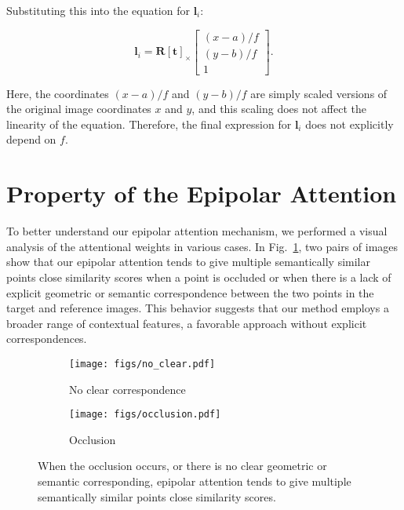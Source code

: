 Substituting this into the equation for $\boldsymbol{l}_i$:

\begin{equation}
    \boldsymbol{l}_i = \mathbf{R} [\boldsymbol{t}]_{\times} 
        \left[\begin{array}{c}
            (x-a) / f \\
            (y-b) / f \\
            1
        \end{array}\right].
\end{equation}

\noindent Here, the coordinates $(x - a)/f$ and $(y - b)/f$ are simply scaled versions of the original image coordinates $x$ and $y$, and this scaling does not affect the linearity of the equation. Therefore, the final expression for $\boldsymbol{l}_i$ does not explicitly depend on $f$.


\section{Property of the Epipolar Attention}
To better understand our epipolar attention mechanism, we performed a visual analysis of the attentional weights in various cases. In  Fig.~\ref{fig:attn_analysis}, two pairs of images show that our epipolar attention tends to give multiple semantically similar points close similarity scores when a point is occluded or when there is a lack of explicit geometric or semantic correspondence between the two points in the target and reference images. This behavior suggests that our method employs a broader range of contextual features, a favorable approach without explicit correspondences.
\begin{figure}[t]
\centering
  \begin{subfigure}[t]{.36\linewidth}
    \centering
    \texttt{[image: figs/no\_clear.pdf]}
    \caption{No clear correspondence}
  \end{subfigure}
  \hspace{1em}
  \begin{subfigure}[t]{.36\linewidth}
    \centering
    \texttt{[image: figs/occlusion.pdf]}
    \caption{Occlusion}
  \end{subfigure}
  \hfill
\caption{When the occlusion occurs, or there is no clear geometric or semantic corresponding, epipolar attention tends to give multiple semantically similar points close similarity scores.}
\label{fig:attn_analysis}
\end{figure}

